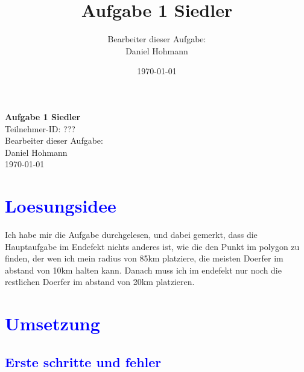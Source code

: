 \documentclass{article}
\title{\Huge{\textbf{Aufgabe 1 Siedler}} \\ \centering{\LARGE{Teilnahme-ID: ?????}}}
\author{Bearbeiter dieser Aufgabe: \\ Daniel Hohmann}
\date{\today}
\begin{document}
\thispagestyle{empty}
\begin{center}
\Huge{\textbf{Aufgabe 1 Siedler}}
\\
\LARGE{Teilnehmer-ID: ???}
\\
\LARGE{Bearbeiter dieser Aufgabe: \\ Daniel Hohmann}
\\
\LARGE{\today}
\end{center}
\newpage
\setcounter{page}{1}
\tableofcontents
\newpage
\section{\textcolor{blue}{Loesungsidee}}
\begin{center}
Ich habe mir die Aufgabe durchgelesen, und dabei gemerkt, dass die Hauptaufgabe im Endefekt nichts anderes ist, wie die den Punkt im polygon zu finden, der wen ich mein radius von 85km platziere, die meisten Doerfer im abstand von 10km halten kann. Danach muss ich im endefekt nur noch die restlichen Doerfer im abstand von 20km platzieren.
\end{center}
\section{\textcolor{blue}{Umsetzung}}
\subsection{\textcolor{blue}{Erste schritte und fehler}}
\end{document}
